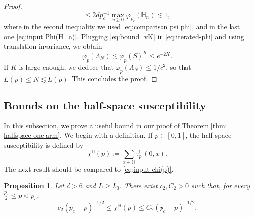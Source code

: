 \documentclass[11pt,a4paper]{article}
\numberwithin{equation}{section}
\theoremstyle{plain}
\newtheorem{Prop}[Thm]{Proposition}
\theoremstyle{definition}
\newcommand{\1}{\mathbf 1}
\begin{document}
\begin{proof}
\begin{equation}
\leq 2dp_c^{-1} \max_{n\geq 0}\varphi_{p_c}(\mathbb H_n)\lesssim 1,
\end{equation}
where in the second inequality we used \eqref{eq:comparison psi phi}, and in the last one \eqref{eq:input Phi(H_n)}. Plugging \eqref{eq:bound_vK} in \eqref{eq:iterated-phi} and using translation invariance, we obtain
\begin{equation}\label{}
\varphi_p(\Lambda_N)  \lesssim  \varphi_p(S)^K \leq e^{-2K}.
\end{equation}
If $K$ is large enough, we deduce that $\varphi_p(\Lambda_N)\leq 1/e^2$, so that $L(p)\leq N\lesssim \tilde{L}(p)$. This concludes the proof.
\end{proof}

\subsection{Bounds on the half-space susceptibility}

In this subsection, we prove a useful bound in our proof of Theorem \ref{thm: halfspace one arm}. We begin with a definition. If $p\in[0,1]$, the half-space susceptibility is defined by
\begin{equation}
	\chi^{\mathbb H}(p):=\sum_{x\in \mathbb H}\tau_{p}^{\mathbb H}(0,x).
\end{equation}
The next result should be compared to \eqref{eq:input chi(p)}.

\begin{Prop}\label{prop:half-space_susceptibility}
Let $d>6$ and $L\geq L_0$. There exist $c_2,C_2>0$ such that, for every $\tfrac{p_c}{2}\leq p<p_c$,
\begin{equation}\label{eq:half-space_susceptibility}
	c_2(p_c-p)^{-1/2}\leq\chi^{\mathbb H}(p)\leq C_2(p_c-p)^{-1/2}.
\end{equation}
\end{Prop}
\end{document}
